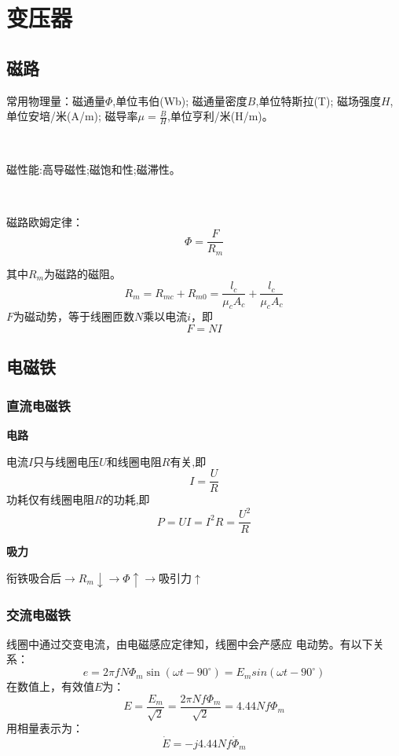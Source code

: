\section{变压器}

\subsection{磁路}

常用物理量：磁通量$\varPhi $,单位韦伯(Wb);
磁通量密度$B$,单位特斯拉(T);
磁场强度$H$,单位安培/米(A/m);
磁导率$\mu = \frac{B}{H}$,单位亨利/米(H/m)。

\

\noindent 磁性能:高导磁性;磁饱和性;磁滞性。

\

\noindent 磁路欧姆定律：
\begin{equation}
    \varPhi = \frac{F}{R_m}
\end{equation}

\noindent 其中$R_m$为磁路的磁阻。
\[
    R_m = R_{mc}+R_{m0}=\frac{l_c}{\mu _c A_c}+\frac{l_c}{\mu _cA_c}
\]
$F$为磁动势，等于线圈匝数$N$乘以电流$i$，即
\[F=NI\]

\subsection{电磁铁}

\subsubsection{直流电磁铁}

\textbf{电路}

\noindent 电流$I$只与线圈电压$U$和线圈电阻$R$有关,即
\[I=\frac{U}{R}\]
功耗仅有线圈电阻$R$的功耗,即
\[P=UI=I^2R=\frac{U^2}{R}\]

\textbf{吸力}

衔铁吸合后$\rightarrow R_m  \downarrow \rightarrow\varPhi  \uparrow \rightarrow$吸引力$\uparrow$

\subsubsection{交流电磁铁}

线圈中通过交变电流，由电磁感应定律知，线圈中会产感应
电动势。有以下关系：
\begin{equation}
    e = 2\pi fN\varPhi _m\sin (\omega t-90^\circ) = E_m sin (\omega t-90^\circ)
\end{equation}
在数值上，有效值$E$为：
\begin{equation}
    E = \frac{E_m}{\sqrt{2}}=\frac{2\pi Nf\varPhi _m}{\sqrt{2}} = 4.44Nf\varPhi _m 
\end{equation}
用相量表示为：
\begin{equation}
    \dot{E} = -j4.44Nf\dot{\varPhi} _m
\end{equation}

